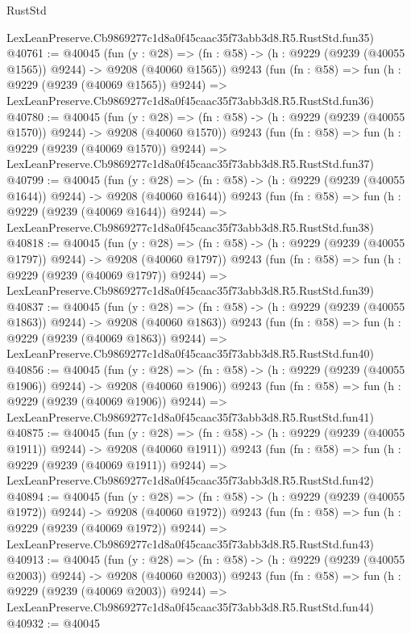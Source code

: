\begin{lexlean}{RustStd}
\begin{coremodule}
    LexLeanPreserve.Cb9869277c1d8a0f45caac35f73abb3d8.R5.RustStd.fun35)
@40761 := @40045
    (fun (y : @28) =>
    (fn : @58) -> (h : @9229 (@9239 (@40055 @1565)) @9244) -> @9208 (@40060 @1565))
    @9243
    (fun (fn : @58) =>
    fun (h : @9229 (@9239 (@40069 @1565)) @9244) =>
    LexLeanPreserve.Cb9869277c1d8a0f45caac35f73abb3d8.R5.RustStd.fun36)
@40780 := @40045
    (fun (y : @28) =>
    (fn : @58) -> (h : @9229 (@9239 (@40055 @1570)) @9244) -> @9208 (@40060 @1570))
    @9243
    (fun (fn : @58) =>
    fun (h : @9229 (@9239 (@40069 @1570)) @9244) =>
    LexLeanPreserve.Cb9869277c1d8a0f45caac35f73abb3d8.R5.RustStd.fun37)
@40799 := @40045
    (fun (y : @28) =>
    (fn : @58) -> (h : @9229 (@9239 (@40055 @1644)) @9244) -> @9208 (@40060 @1644))
    @9243
    (fun (fn : @58) =>
    fun (h : @9229 (@9239 (@40069 @1644)) @9244) =>
    LexLeanPreserve.Cb9869277c1d8a0f45caac35f73abb3d8.R5.RustStd.fun38)
@40818 := @40045
    (fun (y : @28) =>
    (fn : @58) -> (h : @9229 (@9239 (@40055 @1797)) @9244) -> @9208 (@40060 @1797))
    @9243
    (fun (fn : @58) =>
    fun (h : @9229 (@9239 (@40069 @1797)) @9244) =>
    LexLeanPreserve.Cb9869277c1d8a0f45caac35f73abb3d8.R5.RustStd.fun39)
@40837 := @40045
    (fun (y : @28) =>
    (fn : @58) -> (h : @9229 (@9239 (@40055 @1863)) @9244) -> @9208 (@40060 @1863))
    @9243
    (fun (fn : @58) =>
    fun (h : @9229 (@9239 (@40069 @1863)) @9244) =>
    LexLeanPreserve.Cb9869277c1d8a0f45caac35f73abb3d8.R5.RustStd.fun40)
@40856 := @40045
    (fun (y : @28) =>
    (fn : @58) -> (h : @9229 (@9239 (@40055 @1906)) @9244) -> @9208 (@40060 @1906))
    @9243
    (fun (fn : @58) =>
    fun (h : @9229 (@9239 (@40069 @1906)) @9244) =>
    LexLeanPreserve.Cb9869277c1d8a0f45caac35f73abb3d8.R5.RustStd.fun41)
@40875 := @40045
    (fun (y : @28) =>
    (fn : @58) -> (h : @9229 (@9239 (@40055 @1911)) @9244) -> @9208 (@40060 @1911))
    @9243
    (fun (fn : @58) =>
    fun (h : @9229 (@9239 (@40069 @1911)) @9244) =>
    LexLeanPreserve.Cb9869277c1d8a0f45caac35f73abb3d8.R5.RustStd.fun42)
@40894 := @40045
    (fun (y : @28) =>
    (fn : @58) -> (h : @9229 (@9239 (@40055 @1972)) @9244) -> @9208 (@40060 @1972))
    @9243
    (fun (fn : @58) =>
    fun (h : @9229 (@9239 (@40069 @1972)) @9244) =>
    LexLeanPreserve.Cb9869277c1d8a0f45caac35f73abb3d8.R5.RustStd.fun43)
@40913 := @40045
    (fun (y : @28) =>
    (fn : @58) -> (h : @9229 (@9239 (@40055 @2003)) @9244) -> @9208 (@40060 @2003))
    @9243
    (fun (fn : @58) =>
    fun (h : @9229 (@9239 (@40069 @2003)) @9244) =>
    LexLeanPreserve.Cb9869277c1d8a0f45caac35f73abb3d8.R5.RustStd.fun44)
@40932 := @40045

\end{coremodule}
\end{lexlean}
